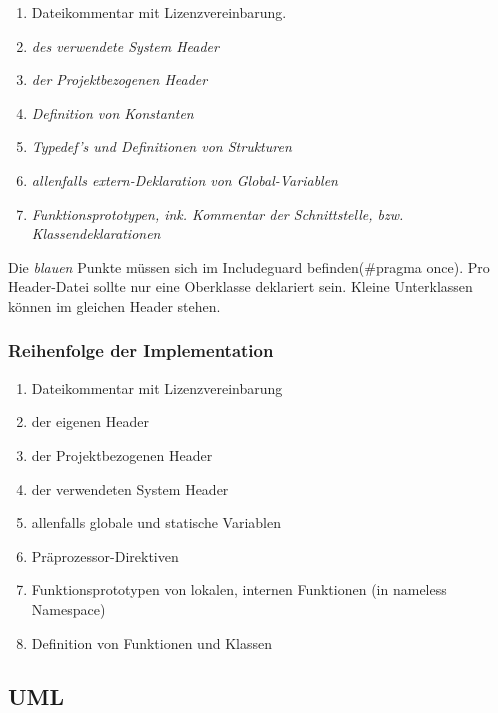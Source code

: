 \begin{enumerate}[itemsep=1pt, parsep=0pt]
    \item Dateikommentar mit Lizenzvereinbarung.
    \item \textit{\color{blue}  des verwendete System Header}
    \item \textit{\color{blue}  der Projektbezogenen Header}
    \item \textit{\color{blue} Definition von Konstanten}
    \item \textit{\color{blue} Typedef's und Definitionen von Strukturen}
    \item \textit{\color{blue} allenfalls extern-Deklaration von Global-Variablen}
    \item \textit{\color{blue} Funktionsprototypen, ink. Kommentar der Schnittstelle, bzw. Klassendeklarationen}
\end{enumerate}

Die \textit{blauen} Punkte müssen sich im Includeguard befinden(\#pragma once). 
Pro Header-Datei sollte nur eine Oberklasse deklariert sein. 
Kleine Unterklassen können im gleichen Header stehen.

\subsubsection{Reihenfolge der Implementation}

\begin{enumerate}[itemsep=1pt, parsep=0pt]
    \item Dateikommentar mit Lizenzvereinbarung
    \item {} der eigenen Header
    \item {} der Projektbezogenen Header
    \item {} der verwendeten System Header
    \item allenfalls globale und statische Variablen
    \item Präprozessor-Direktiven
    \item Funktionsprototypen von lokalen, internen Funktionen (in nameless Namespace)
    \item Definition von Funktionen und Klassen
\end{enumerate}

\subsection{UML}

